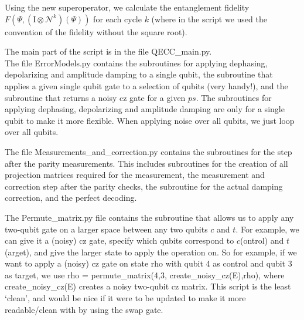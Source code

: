 \documentclass[twoside]{article}
\newcommand{\N}{\mathcal N}
\begin{document}
Using the new superoperator, we calculate the entanglement fidelity $F(\Psi,\left(\mathrm{I}\otimes \N^k\right)(\Psi))$ for each cycle $k$ (where in the script we used the convention of the fidelity without the square root).
%
%



The main part of the script is in the file QECC\_main.py.\\

The file ErrorModels.py contains the subroutines for applying dephasing, depolarizing and amplitude damping to a single qubit, the subroutine that applies a given single qubit gate to a selection of qubits (very handy!), and the subroutine that returns a noisy cz gate for a given $ps$. The subroutines for applying dephasing, depolarizing and amplitude damping are only for a single qubit to make it more flexible. When applying noise over all qubits, we just loop over all qubits.

The file Measurements\_and\_correction.py contains the subroutines for the step after the parity measurements. This includes subroutines for the creation of all projection matrices required for the measurement, the measurement and correction step after the parity checks, the subroutine for the actual damping correction, and the perfect decoding.

The Permute\_matrix.py file contains the subroutine that allows us to apply any two-qubit gate on a larger space between any two qubits $c$ and $t$. For example, we can give it a (noisy)  cz gate, specify which qubits correspond to $c$(ontrol) and $t$(arget), and give the larger state to apply the operation on. So for example, if we want to apply a (noisy) cz gate on state rho with qubit 4 as control and qubit 3 as target, we use rho = permute\_matrix(4,3, create\_noisy\_cz(E),rho), where create\_noisy\_cz(E) creates a noisy two-qubit cz matrix. This script is the least `clean', and would be nice if it were to be updated to make it more readable/clean with by using the swap gate.
\end{document}
